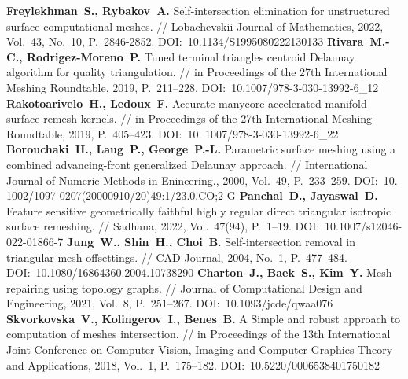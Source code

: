 \begin{thebibliography}{99}
%
\textbf{Freylekhman~S., Rybakov~A.} Self-intersection elimination for unstructured surface computational meshes. // Lobachevskii Journal of Mathematics, 2022, Vol.~43, No.~10, P.~2846-2852. DOI:~10.1134/S1995080222130133
%
\textbf{Rivara~M.-C., Rodrigez-Moreno~P.} Tuned terminal triangles centroid Delaunay algorithm for quality triangulation. // in Proceedings of the 27th International Meshing Roundtable, 2019, P.~211–228. DOI:~10.1007/978-3-030-13992-6\_12
%
\textbf{Rakotoarivelo~H., Ledoux~F.} Accurate manycore-accelerated manifold surface remesh kernels. // in Proceedings of the 27th International Meshing Roundtable, 2019, P.~405–423. DOI:~10.
1007/978-3-030-13992-6\_22
%
\textbf{Borouchaki~H., Laug~P., George~P.-L.} Parametric surface meshing using a combined advancing-front generalized Delaunay approach. // International Journal of Numeric Methods in Enineering., 2000, Vol.~49, P.~233–259. DOI:~10.
1002/1097-0207(20000910/20)49:1/23.0.CO;2-G
%
\textbf{Panchal~D., Jayaswal~D.} Feature sensitive geometrically faithful highly regular direct 
triangular isotropic surface remeshing. // Sadhana, 2022, Vol.~47(94), P.~1–19. DOI:~10.1007/s12046-022-01866-7
%
\textbf{Jung~W., Shin~H., Choi~B.} Self-intersection removal in triangular mesh offsettings. // CAD Journal, 2004, No.~1, P.~477–484. DOI:~10.1080/16864360.2004.10738290
%
\textbf{Charton~J., Baek~S., Kim~Y.} Mesh repairing using topology graphs. // Journal of Computational Design and Engineering, 2021, Vol.~8, P.~251–267. DOI:~10.1093/jcde/qwaa076
%
\textbf{Skvorkovska~V., Kolingerov~I., Benes~B.} A Simple and robust approach to computation of meshes intersection. // in Proceedings of the 13th International Joint Conference on Computer Vision, Imaging and Computer Graphics Theory and Applications, 2018, Vol.~1, P.~175–182. DOI:~10.5220/0006538401750182
%




\end{thebibliography}

